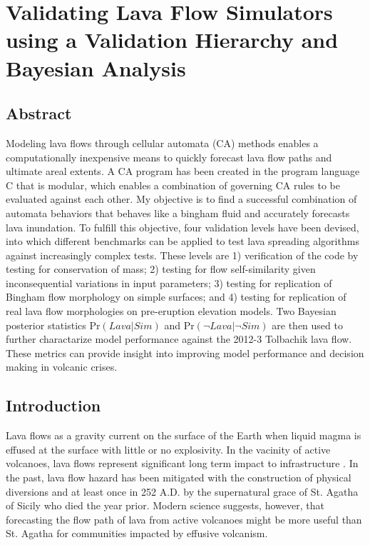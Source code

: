 \chapter[Validating Lava Flow Simulators using a Validation Hierarchy and Bayesian Analysis]{Validating Lava Flow Simulators using a Validation Hierarchy and Bayesian Analysis}


\renewcommand*{\FigPath}{../Chapter-molasses/figures}

\section*{Abstract}
	Modeling lava flows through cellular automata (CA) methods enables a computationally inexpensive means to quickly forecast lava flow paths and ultimate areal extents. A CA program has been created in the program language C that is modular, which enables a combination of governing CA rules to be evaluated against each other. My objective is to find a successful combination of automata behaviors that behaves like a bingham fluid and accurately forecasts lava inundation. To fulfill this objective, four validation levels have been devised, into which different benchmarks can be applied to test lava spreading algorithms against increasingly complex tests. These levels are 1) verification of the code by testing for conservation of mass; 2) testing for flow self-similarity given inconsequential variations in input parameters; 3) testing for replication of Bingham flow morphology on simple surfaces; and 4) testing for replication of real lava flow morphologies on pre-eruption elevation models. Two Bayesian posterior statistics $\text{Pr}(Lava|Sim)$ and $\text{Pr}(\neg Lava|\neg Sim)$ are then used to further charactarize model performance against the 2012-3 Tolbachik lava flow. These metrics can provide insight into improving model performance and decision making in volcanic crises.

\section{Introduction}
	Lava flows as a gravity current on the surface of the Earth when liquid magma is effused at the surface with little or no explosivity. In the vacinity of active volcanoes, lava flows represent significant long term impact to infrastructure \citep{peterson2000lava}. In the past, lava flow hazard has been mitigated with the construction of physical diversions and at least once in 252 A.D. by the supernatural grace of St. Agatha of Sicily who died the year prior. Modern science suggests, however, that forecasting the flow path of lava from active volcanoes might be more useful than St. Agatha for communities impacted by effusive volcanism.


